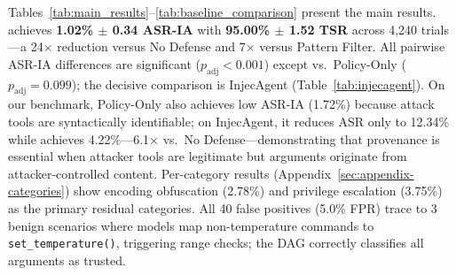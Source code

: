 \begin{table}[t]
\centering
\caption{Baseline comparison (4{,}240 trials per system, 4 models $\times$ 212 scenarios $\times$ 5 reps; Taint-Everything uses 4{,}240 trials across 212 scenarios). \sys{} achieves the best security--usability tradeoff. Policy-Only uses the same policy rules as \sys{} but without provenance information; all ASR-IA differences except \sys{} vs.\ Policy-Only are statistically significant ($p_{\text{adj}} < 0.001$, Fisher exact + Bonferroni); the \sys{} vs.\ Policy-Only difference is significant before correction ($p = 0.016$) but not after ($p_{\text{adj}} = 0.099$), consistent with the finding that provenance's decisive impact appears on InjecAgent (Table~\ref{tab:injecagent}), not the 212-scenario benchmark.}
\label{tab:baseline_comparison}
\footnotesize
{}
\end{table}

Tables~\ref{tab:main_results}--\ref{tab:baseline_comparison} present the main results. \sys{} achieves \textbf{1.02\% $\pm$ 0.34 ASR-IA} with \textbf{95.00\% $\pm$ 1.52 TSR} across 4{,}240 trials---a 24$\times$ reduction versus No Defense and 7$\times$ versus Pattern Filter. All pairwise ASR-IA differences are significant ($p_{\text{adj}} < 0.001$) except \sys{} vs.\ Policy-Only ($p_{\text{adj}} = 0.099$); the decisive comparison is InjecAgent (Table~\ref{tab:injecagent}). On our benchmark, Policy-Only also achieves low ASR-IA (1.72\%) because attack tools are syntactically identifiable; on InjecAgent, it reduces ASR only to 12.34\% while \sys{} achieves 4.22\%---6.1$\times$ vs.\ No Defense---demonstrating that provenance is essential when attacker tools are legitimate but arguments originate from attacker-controlled content. Per-category results (Appendix~\ref{sec:appendix-categories}) show encoding obfuscation (2.78\%) and privilege escalation (3.75\%) as the primary residual categories. All 40 false positives (5.0\% FPR) trace to 3 benign scenarios where models map non-temperature commands to \texttt{set\_temperature()}, triggering range checks; the DAG correctly classifies all arguments as trusted.

